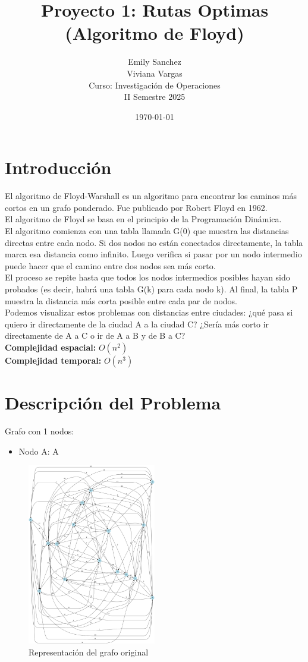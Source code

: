\documentclass[12pt]{article}
\title{Proyecto 1: Rutas Optimas (Algoritmo de Floyd)}
\author{Emily Sanchez \\ Viviana Vargas \\[1cm] Curso: Investigación de Operaciones \\ II Semestre 2025}
\date{\today}
\begin{document}
\maketitle
\thispagestyle{empty}
\newpage
\setcounter{page}{1}

\section{Introducción}
El algoritmo de Floyd-Warshall es un algoritmo para encontrar los caminos más cortos en un grafo ponderado. Fue publicado por Robert Floyd en 1962.\\
El algoritmo de Floyd se basa en el principio de la Programación Dinámica.\\
El algoritmo comienza con una tabla llamada G(0) que muestra las distancias directas entre cada nodo. Si dos nodos no están conectados directamente, la tabla marca esa distancia como infinito. Luego verifica si pasar por un nodo intermedio puede hacer que el camino entre dos nodos sea más corto.\\
El proceso se repite hasta que todos los nodos intermedios posibles hayan sido probados (es decir, habrá una tabla G(k) para cada nodo k). Al final, la tabla P muestra la distancia más corta posible entre cada par de nodos.\\
Podemos visualizar estos problemas con distancias entre ciudades: ¿qué pasa si quiero ir directamente de la ciudad A a la ciudad C? ¿Sería más corto ir directamente de A a C o ir de A a B y de B a C?\\
\textbf{Complejidad espacial:} $O(n^2)$\\
\textbf{Complejidad temporal:} $O(n^3)$\\
\clearpage
\section{Descripción del Problema}
Grafo con 1 nodos:

\begin{itemize}
\item Nodo A: A
\end{itemize}

\begin{figure}[h!]
\centering
\includegraphics[width=0.5\textwidth,keepaspectratio]{grafo.png}
\caption{Representación del grafo original}
\end{figure}
\end{document}
